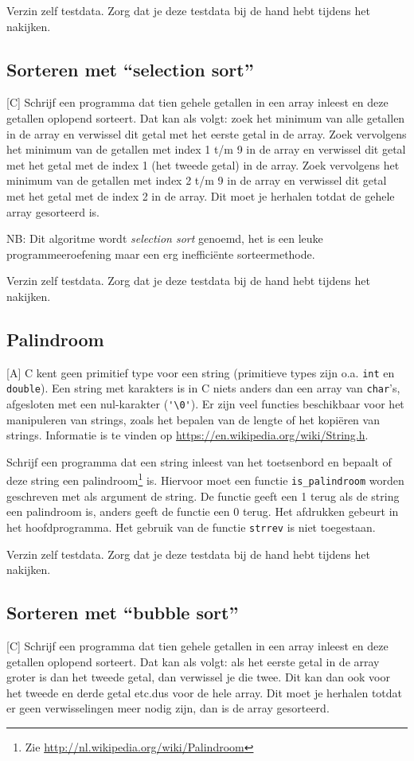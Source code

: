 \documentclass[a4paper,10pt,fleqn,twoside]{article}
\begin{document}
Verzin zelf testdata. Zorg dat je deze testdata bij de hand hebt tijdens het nakijken.

\subsection{Sorteren met ``selection sort''}[C]
Schrijf een programma dat tien gehele getallen in een array inleest en deze getallen oplopend sorteert. Dat kan als volgt: zoek het minimum van alle getallen in de array en verwissel dit getal met het eerste getal in de array. Zoek vervolgens het minimum van de getallen met index 1 t/m 9 in de array en verwissel dit getal met het getal met de index 1 (het tweede getal) in de array. Zoek vervolgens het minimum van de getallen met index 2 t/m 9 in de array en verwissel dit getal met het getal met de index 2 in de array. Dit moet je herhalen totdat de gehele array gesorteerd is.

NB: Dit algoritme wordt \textsl{selection sort} genoemd, het is een leuke programmeeroefening maar een erg inefficiënte sorteermethode.

Verzin zelf testdata. Zorg dat je deze testdata bij de hand hebt tijdens het nakijken.

\subsection{Palindroom}[A]
C kent geen primitief type voor een string (primitieve types zijn o.a. \lstinline|int| en \lstinline|double|). Een string met karakters is in C niets anders dan een array van \lstinline|char|’s, afgesloten met een nul-karakter (\lstinline|'\0'|). Er zijn veel functies beschikbaar voor het manipuleren van strings, zoals het bepalen van de lengte of het kopiëren van strings. Informatie is te vinden op \url{https://en.wikipedia.org/wiki/String.h}.

Schrijf een programma dat een string inleest van het toetsenbord en bepaalt of deze string een palindroom\footnote{Zie \url{http://nl.wikipedia.org/wiki/Palindroom}} is. Hiervoor moet een functie \lstinline|is_palindroom| worden geschreven met als argument de string. De functie geeft een 1 terug als de string een palindroom is, anders geeft de functie een 0 terug. Het afdrukken gebeurt in het hoofdprogramma. Het gebruik van de functie \lstinline|strrev| is niet toegestaan.

Verzin zelf testdata. Zorg dat je deze testdata bij de hand hebt tijdens het nakijken.

\subsection{Sorteren met ``bubble sort''}[C]
Schrijf een programma dat tien gehele getallen in een array inleest en deze getallen oplopend sorteert. Dat kan als volgt: als het eerste getal in de array groter is dan het tweede getal, dan verwissel je die twee. Dit kan dan ook voor het tweede en derde getal etc.\@ dus voor de hele array. Dit moet je herhalen totdat er geen verwisselingen meer nodig zijn, dan is de array gesorteerd.
\end{document}
